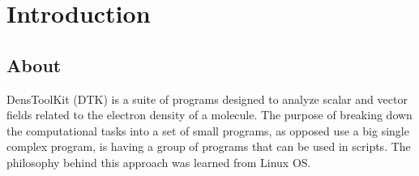 

\chapter{Introduction}

\section{About \DTK}

DensToolKit (DTK) is a suite of programs designed to analyze scalar
and vector fields related to the 
electron density of a molecule. The purpose of breaking down the computational tasks into a 
set of small programs, as opposed use a big single complex program, 
is having a group of programs that can be used in scripts. The philosophy behind this
approach was learned from Linux OS.

